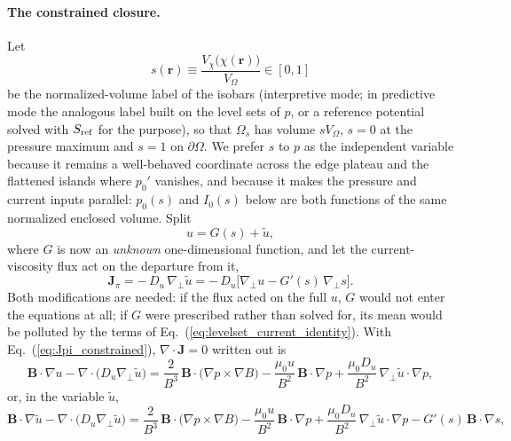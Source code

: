 \documentclass[english]{article}
\newcommand{\bB}{\mathbf{B}}
\newcommand{\bJ}{\mathbf{J}}
\newcommand{\br}{\mathbf{r}}
\newcommand{\gradperp}{\nabla_{\!\perp}}
\begin{document}
\paragraph{The constrained closure.}
Let
\begin{equation}
s(\br)\equiv\frac{V_\chi\big(\chi(\br)\big)}{V_\Omega}\in[0,1]
\label{eq:s_label}
\end{equation}
be the normalized-volume label of the isobars (interpretive mode; in predictive mode the analogous
label built on the level sets of $p$, or a reference potential solved with $S_{\rm ref}$ for the
purpose), so that $\Omega_s$ has volume $sV_\Omega$, $s=0$ at the pressure maximum and $s=1$ on
$\partial\Omega$. We prefer $s$ to $p$ as the independent variable because it remains a
well-behaved coordinate across the edge plateau and the flattened islands where $p_0'$ vanishes,
and because it makes the pressure and current inputs parallel: $p_0(s)$ and $I_0(s)$ below are
both functions of the same normalized enclosed volume. Split
\begin{equation}
u=G(s)+\tilde u ,
\label{eq:u_split}
\end{equation}
where $G$ is now an \emph{unknown} one-dimensional function, and let the current-viscosity flux act
on the departure from it,
\begin{equation}
\bJ_\pi=-\,D_u\,\gradperp\tilde u=-\,D_u\big[\gradperp u-G'(s)\,\gradperp s\big] .
\label{eq:Jpi_constrained}
\end{equation}
Both modifications are needed: if the flux acted on the full $u$, $G$ would not enter the equations
at all; if $G$ were prescribed rather than solved for, its mean would be polluted by the terms of
Eq.~(\ref{eq:levelset_current_identity}). With Eq.~(\ref{eq:Jpi_constrained}), $\nabla\cdot\bJ=0$
written out is
\begin{equation}
\bB\cdot\nabla u-\nabla\cdot\big(D_u\gradperp\tilde u\big)
=\frac{2}{B^{3}}\,\bB\cdot\big(\nabla p\times\nabla B\big)
-\frac{\mu_0 u}{B^{2}}\,\bB\cdot\nabla p
+\frac{\mu_0 D_u}{B^{2}}\,\gradperp\tilde u\cdot\nabla p ,
\label{eq:u_equation_constrained}
\end{equation}
or, in the variable $\tilde u$,
\begin{equation}
\bB\cdot\nabla\tilde u-\nabla\cdot\big(D_u\gradperp\tilde u\big)
=\frac{2}{B^{3}}\,\bB\cdot\big(\nabla p\times\nabla B\big)
-\frac{\mu_0 u}{B^{2}}\,\bB\cdot\nabla p
+\frac{\mu_0 D_u}{B^{2}}\,\gradperp\tilde u\cdot\nabla p
-G'(s)\,\bB\cdot\nabla s ,
\label{eq:utilde_equation}
\end{equation}
\end{document}
